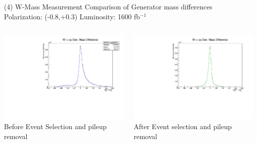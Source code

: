 \documentclass[10pt]{beamer}
\begin{document}
\begin{frame}{(4) W-Mass Measurement }
Comparison of Generator mass differences\\
Polarization: (-0.8,+0.3)\quad
Luminosity: 1600 fb$^{-1}$\\
\scriptsize
\begin{columns}
\begin{column}{0.5\textwidth}
\includegraphics[scale=0.3, left]{mqqdiffOLHist.pdf} \\
Before Event Selection and pileup removal
\end{column}
\begin{column}{0.5\textwidth}

\includegraphics[scale=0.3, left]{mqqdiffHist.pdf} \\
After Event selection and pileup removal
\end{column}
\end{columns}
\quad \quad \\
\quad \quad \\


\end{frame}
\end{document}
